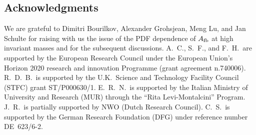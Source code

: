 \subsection*{Acknowledgments}

We are grateful to Dimitri Bourilkov, Alexander Grohsjean, Meng Lu, and Jan Schulte for raising with us the issue of the
PDF dependence of $A_{\rm fb}$ at high invariant masses and for the subsequent discussions.
%
A.~C., S.~F., and F.~H.\ are supported by
the European Research Council under 
the European Union's Horizon 2020 research and innovation Programme
(grant agreement n.740006).
%
R.~D.~B.\ is supported by the U.K.\
Science and Technology Facility Council (STFC) grant ST/P000630/1.
%
E.~R.~N.\ is supported by the Italian Ministry of University and Research (MUR)
through the ``Rita Levi-Montalcini'' Program.
%
J.~R.\ is partially supported by NWO (Dutch Research Council).
%
C.~S.\ is supported by the German Research Foundation (DFG) under
reference number DE~623/6-2.
